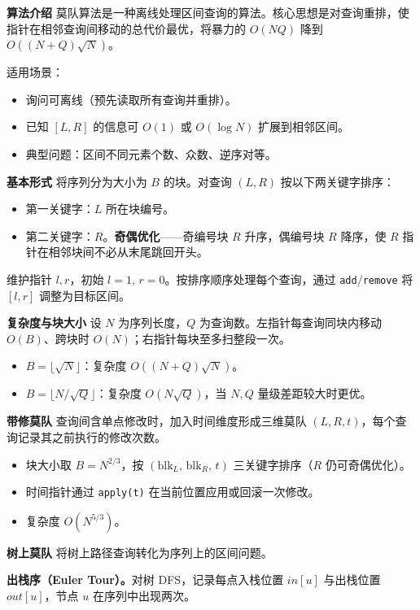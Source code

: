 \textbf{算法介绍}
莫队算法是一种离线处理区间查询的算法。核心思想是对查询重排，使指针在相邻查询间移动的总代价最优，将暴力的 $O(NQ)$ 降到 $O\!\left((N+Q)\sqrt{N}\right)$。

适用场景：
\begin{itemize}
\item 询问可离线（预先读取所有查询并重排）。
\item 已知 $[L,R]$ 的信息可 $O(1)$ 或 $O(\log N)$ 扩展到相邻区间。
\item 典型问题：区间不同元素个数、众数、逆序对等。
\end{itemize}

\textbf{基本形式}
将序列分为大小为 $B$ 的块。对查询 $(L,R)$ 按以下两关键字排序：
\begin{itemize}
\item 第一关键字：$L$ 所在块编号。
\item 第二关键字：$R$。\textbf{奇偶优化}——奇编号块 $R$ 升序，偶编号块 $R$ 降序，使 $R$ 指针在相邻块间不必从末尾跳回开头。
\end{itemize}
维护指针 $l,r$，初始 $l=1,\,r=0$。按排序顺序处理每个查询，通过 \texttt{add}/\texttt{remove} 将 $[l,r]$ 调整为目标区间。

\textbf{复杂度与块大小}
设 $N$ 为序列长度，$Q$ 为查询数。左指针每查询同块内移动 $O(B)$、跨块时 $O(N)$；右指针每块至多扫整段一次。
\begin{itemize}
\item $B=\lfloor\sqrt{N}\rfloor$：复杂度 $O\!\left((N+Q)\sqrt{N}\right)$。
\item $B=\lfloor N/\sqrt{Q}\rfloor$：复杂度 $O(N\sqrt{Q})$，当 $N,Q$ 量级差距较大时更优。
\end{itemize}

\textbf{带修莫队}
查询间含单点修改时，加入时间维度形成三维莫队 $(L,R,t)$，每个查询记录其之前执行的修改次数。
\begin{itemize}
\item 块大小取 $B=N^{2/3}$，按 $(\mathrm{blk}_L,\,\mathrm{blk}_R,\,t)$ 三关键字排序（$R$ 仍可奇偶优化）。
\item 时间指针通过 \texttt{apply(t)} 在当前位置应用或回滚一次修改。
\item 复杂度 $O\!\left(N^{5/3}\right)$。
\end{itemize}

\textbf{树上莫队}
将树上路径查询转化为序列上的区间问题。

\textbf{出栈序（Euler Tour）。}对树 DFS，记录每点入栈位置 $in[u]$ 与出栈位置 $out[u]$，节点 $u$ 在序列中出现两次。

